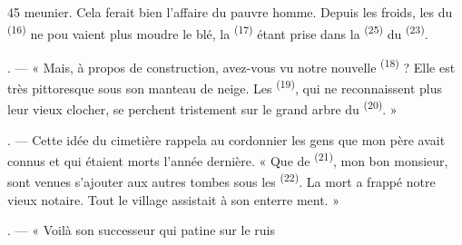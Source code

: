 \begin{VUpage}[47]{45}
\VUcontinue
meunier. Cela ferait bien l'affaire du pauvre homme.\nl
Depuis les froids, les  du \textsuperscript{(16)} ne pou\cc
vaient plus moudre le blé, la \textsuperscript{(17)} étant prise\nl
dans la \textsuperscript{(25)} du \textsuperscript{(23)}.

. --- « Mais, à propos de construction, avez-vous\nl
vu notre nouvelle \textsuperscript{(18)} ? Elle est très pittoresque\nl
sous son manteau de neige. Les \textsuperscript{(19)}, qui ne\nl
reconnaissent plus leur vieux clocher, se perchent\nl
tristement sur le grand arbre du \textsuperscript{(20)}. »

. --- Cette idée du cimetière rappela au cordonnier\nl
les gens que mon père avait connus et qui étaient\nl
morts l'année dernière. « Que de \textsuperscript{(21)}, mon bon\nl
monsieur, sont venues s'ajouter aux autres tombes\nl
sous les \textsuperscript{(22)}. La mort a frappé notre vieux\nl
notaire. Tout le village assistait à son enterre\cc
ment. »

. --- « Voilà son successeur qui patine sur le ruis\cc
\parplein
\end{VUpage}

